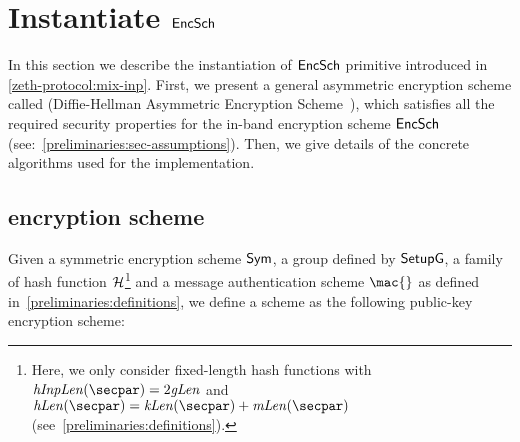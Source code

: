 
\section{Instantiate $\mathsf{EncSch}$}\label{instantiation:enc}

In this section we describe the instantiation of $\mathsf{EncSch}$ primitive introduced in \cref{zeth-protocol:mix-inp}. First, we present a general asymmetric encryption scheme called \dhaes{} (Diffie-Hellman Asymmetric Encryption Scheme~\cite{abdalla1999dhaes}), which satisfies all the required security properties for the in-band encryption scheme $\mathsf{EncSch}$ (see:~\cref{preliminaries:sec-assumptions}). Then, we give details of the concrete algorithms used for the implementation.

\subsection{\dhaes{} encryption scheme}\label{instantiation:enc:dhaes}

Given a symmetric encryption scheme $\mathsf{Sym}{}$, a group defined by $\mathsf{SetupG}{}$, a family of hash function $\mathcal{H}{}$\footnote{Here, we only consider fixed-length hash functions with $\hashInpLen(\secpar) = 2\groupLen$ and $\hashLen(\secpar) = \symKeyLen(\secpar) + \macKeyLen(\secpar)$ (see~\cref{preliminaries:definitions}).} and a message authentication scheme $\mac{}$ as defined in~\cref{preliminaries:definitions}, we define a \dhaes{} scheme as the following public-key encryption scheme:

